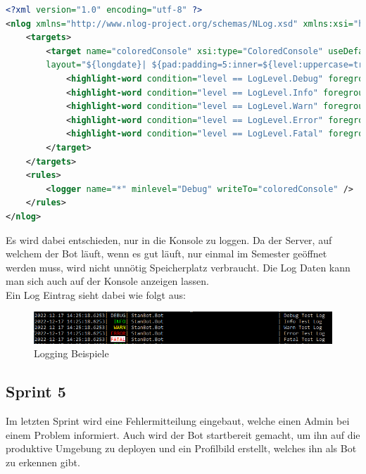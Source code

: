 \documentclass[a4paper, table]{article}
\begin{document}
\begin{lstlisting}[language=XML]
<?xml version="1.0" encoding="utf-8" ?>
<nlog xmlns="http://www.nlog-project.org/schemas/NLog.xsd" xmlns:xsi="http://www.w3.org/2001/XMLSchema-instance">
    <targets>
        <target name="coloredConsole" xsi:type="ColoredConsole" useDefaultRowHighlightingRules="false"
        layout="${longdate}| ${pad:padding=5:inner=${level:uppercase=true}}| ${pad:padding=-50:inner=${logger}}| ${message:withexception=true}" >
            <highlight-word condition="level == LogLevel.Debug" foregroundColor="Gray" text="DEBUG"/>
            <highlight-word condition="level == LogLevel.Info" foregroundColor="Green" text="INFO" />
            <highlight-word condition="level == LogLevel.Warn" foregroundColor="Yellow" text="WARN" />
            <highlight-word condition="level == LogLevel.Error" foregroundColor="Red" text="ERROR"/>
            <highlight-word condition="level == LogLevel.Fatal" foregroundColor="Red" text="FATAL" backgroundColor="White" />
        </target>
    </targets>
    <rules>
        <logger name="*" minlevel="Debug" writeTo="coloredConsole" />
    </rules>
</nlog>
\end{lstlisting}

Es wird dabei entschieden, nur in die Konsole zu loggen. 
Da der Server, auf welchem der Bot läuft, wenn es gut läuft, nur einmal im Semester geöffnet werden muss, wird nicht unnötig Speicherplatz verbraucht. 
Die Log Daten kann man sich auch auf der Konsole anzeigen lassen.\\
Ein Log Eintrag sieht dabei wie folgt aus:

\begin{figure}[h]
    \centering
    \includegraphics[width=1\textwidth]{img/LogLevels.png}
    \caption{Logging Beispiele}
    \label{fig:logging-examples}
\end{figure}

\newpage
\subsection{Sprint 5}
Im letzten Sprint wird eine Fehlermitteilung eingebaut, welche einen Admin bei einem Problem informiert. 
Auch wird der Bot startbereit gemacht, um ihn auf die produktive Umgebung zu deployen und ein Profilbild erstellt, welches ihn als Bot zu erkennen gibt.
\end{document}
